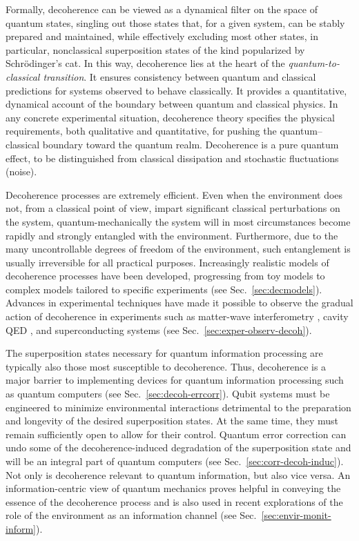\documentclass[aps,pra,reprint,amsmath,amssymb,showpacs,nofootinbib,floatfix,onecolumn,12pt]{revtex4-1}
\begin{document}
Formally, decoherence can be viewed as a dynamical filter on the space of quantum states, singling out those states that, for a given system, can be stably prepared and maintained, while effectively excluding most other states, in particular, nonclassical superposition states of the kind popularized by Schr\"odinger's cat. In this way, decoherence lies at the heart of the \emph{quantum-to-classical transition}. It ensures consistency between quantum and classical predictions for systems observed to behave classically. It provides a quantitative, dynamical account of the boundary between quantum and classical physics. In any concrete experimental situation, decoherence theory specifies the physical requirements, both qualitative and quantitative, for pushing the quantum--classical boundary toward the quantum realm. Decoherence is a pure quantum effect, to be distinguished from classical dissipation and stochastic fluctuations (noise).

Decoherence processes are extremely efficient. Even when the environment does not, from a classical point of view, impart significant classical perturbations on the system, quantum-mechanically the system will in most circumstances become rapidly and strongly entangled with the environment. Furthermore, due to the many uncontrollable degrees of freedom of the environment, such entanglement is usually irreversible for all practical purposes. Increasingly realistic models of decoherence processes have been developed, progressing from toy models to complex models tailored to specific experiments (see Sec.~\ref{sec:decmodels}). Advances in experimental techniques have made it possible to observe the gradual action of decoherence in experiments such as matter-wave interferometry \cite{Hornberger:2012:ii}, cavity QED \cite{Raimond:2001:aa}, and superconducting systems \cite{Leggett:2002:uy} (see Sec.~\ref{sec:exper-observ-decoh}). 

The superposition states necessary for quantum information processing are typically also those most susceptible to decoherence. Thus, decoherence is a major barrier to implementing devices for quantum information processing such as quantum computers (see Sec.~\ref{sec:decoh-errcorr}). Qubit systems must be engineered to minimize environmental interactions detrimental to the preparation and longevity of the desired superposition states. At the same time, they must remain sufficiently open to allow for their control. Quantum error correction can undo some of the decoherence-induced degradation of the superposition state and will be an integral part of quantum computers (see Sec.~\ref{sec:corr-decoh-induc}). Not only is decoherence relevant to quantum information, but also vice versa. An information-centric view of quantum mechanics proves helpful in conveying the essence of the decoherence process and is also used in recent explorations of the role of the environment as an information channel (see Sec.~\ref{sec:envir-monit-inform}).
\end{document}
